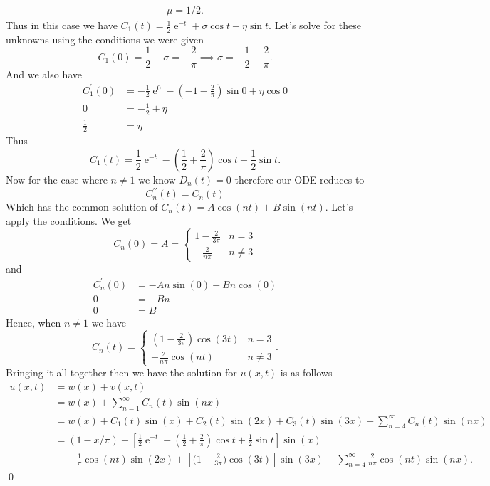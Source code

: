 \documentclass[10pt]{amsart}
\DeclareMathOperator{\E}{e}
\theoremstyle{nonumberplain}
\begin{document}
\begin{enumerate}[label={\bf {\arabic*}:}]
\begin{align*}
\mu = 1/2.
\end{align*}
Thus in this case we have $C_1(t) = \frac 1 2 \E^{-t} + \sigma \cos t + \eta \sin t$.
Let's solve for these unknowns using the conditions we were given
$$
C_1(0) = \frac12 + \sigma = - \frac 2 { \pi} \implies \sigma = -\frac12 - \frac 2 \pi.
$$
And we also have
\begin{align*}
C_1^\prime(0) &= -\frac 1 2\E^{0} - (-1 - \frac 2 \pi) \sin 0 + \eta \cos 0 \\
	0 &= - \frac 1 2 + \eta \\
	\frac 1 2 &= \eta
\end{align*}
Thus
$$
C_1(t) = \frac 1 2 \E^{-t} - \left( \frac 1 2 + \frac 2 \pi \right)\cos t + \frac 1 2 \sin t.
$$
Now for the case where $n \neq 1$ we know $D_n(t) = 0$ therefore our ODE reduces to
$$
C_n^{\prime\prime}(t) = C_n(t)
$$
Which has the common solution of  $C_n(t) = A\cos(nt) + B\sin(nt)$.
Let's apply the conditions.
We get
$$
C_n(0) = A = \begin{cases} 1 - \frac 2 {3 \pi} & n = 3\\ - \frac 2 {n \pi} & n \neq 3 \end{cases}
$$
and
\begin{align*}
C_n^\prime(0) &= -An\sin(0) -Bn\cos(0) \\
	0 &= -Bn \\
	0 &= B
\end{align*}
Hence, when $n \neq 1$ we have
$$
C_n(t) = \begin{cases} \left(1 - \frac 2 {3 \pi}\right)\cos(3t) & n = 3 \\
	- \frac 2 {n \pi}\cos(nt) & n \neq 3 \end{cases}.
$$
Bringing it all together then we have the solution for $u(x, t)$ is as follows
\begin{align*}
u(x, t) &= w(x) + v (x, t) \\
	&= w(x) + \sum_{n=1}^\infty C_n(t) \sin(n x) \\
	&= w(x) + C_1(t) \sin(x) + C_2(t) \sin(2x) + C_3(t) \sin(3x) + \sum_{n=4}^\infty C_n(t) \sin(n x) \\
	&= (1 - x/\pi) + \left[ \frac 1 2 \E^{-t} - \left( \frac 1 2 + \frac 2 \pi \right)\cos t + \frac 1 2 \sin t \right] \sin(x) \\
	&\quad - \frac 1 \pi \cos(nt) \sin(2x) + \left[ \Big(1 - \frac 2 {3 \pi}\Big)\cos(3t) \right] \sin(3x) - \sum_{n=4}^\infty \frac 2 {n \pi}\cos(nt) \sin(n x).
\end{align*}
\qed \\


\end{enumerate}
\end{document}
